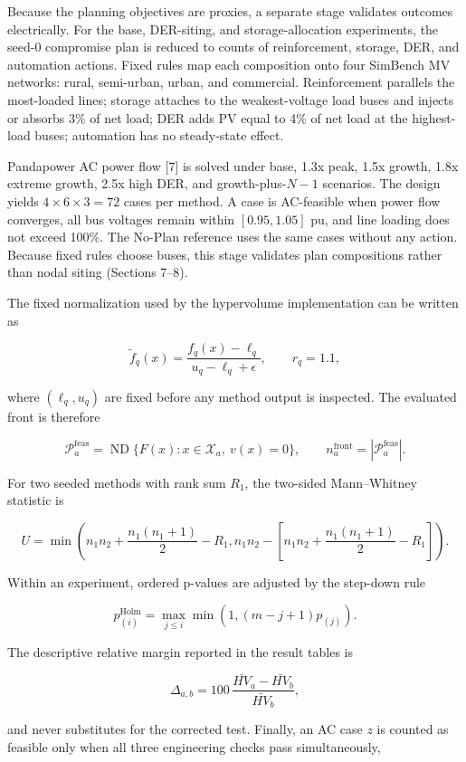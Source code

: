 \documentclass[
  10pt,
  a4paper,
]{article}
\begin{document}
Because the planning objectives are proxies, a separate stage validates
outcomes electrically. For the base, DER-siting, and storage-allocation
experiments, the seed-0 compromise plan is reduced to counts of
reinforcement, storage, DER, and automation actions. Fixed rules map
each composition onto four SimBench MV networks: rural, semi-urban,
urban, and commercial. Reinforcement parallels the most-loaded lines;
storage attaches to the weakest-voltage load buses and injects or
absorbs 3\% of net load; DER adds PV equal to 4\% of net load at the
highest-load buses; automation has no steady-state effect.

Pandapower AC power flow {[}7{]} is solved under base, 1.3x peak, 1.5x
growth, 1.8x extreme growth, 2.5x high DER, and growth-plus-\(N-1\)
scenarios. The design yields \(4\times6\times3=72\) cases per method. A
case is AC-feasible when power flow converges, all bus voltages remain
within \([0.95,1.05]\) pu, and line loading does not exceed 100\%. The
No-Plan reference uses the same cases without any action. Because fixed
rules choose buses, this stage validates plan compositions rather than
nodal siting (Sections 7--8).

The fixed normalization used by the hypervolume implementation can be
written as

\[
\tilde f_q(x)=\frac{f_q(x)-\ell_q}{u_q-\ell_q+\epsilon},
\qquad r_q=1.1,
\]

where \((\ell_q,u_q)\) are fixed before any method output is inspected.
The evaluated front is therefore

\[
\mathcal P_a^{\mathrm{feas}}=
\operatorname{ND}\{F(x):x\in\mathcal X_a,\ v(x)=0\},
\qquad n_a^{\mathrm{front}}=|\mathcal P_a^{\mathrm{feas}}|.
\]

For two seeded methods with rank sum \(R_1\), the two-sided
Mann--Whitney statistic is

\[
U=\min\!\left(n_1n_2+\frac{n_1(n_1+1)}{2}-R_1,
n_1n_2-\left[n_1n_2+\frac{n_1(n_1+1)}{2}-R_1\right]\right).
\]

Within an experiment, ordered p-values are adjusted by the step-down
rule

\[
p^{\mathrm{Holm}}_{(i)}=
\max_{j\leq i}\min\!\left(1,(m-j+1)p_{(j)}\right).
\]

The descriptive relative margin reported in the result tables is

\[
\Delta_{a,b}=100\,\frac{\bar{HV}_a-\bar{HV}_b}{\bar{HV}_b},
\]

and never substitutes for the corrected test. Finally, an AC case \(z\)
is counted as feasible only when all three engineering checks pass
simultaneously,
\end{document}

